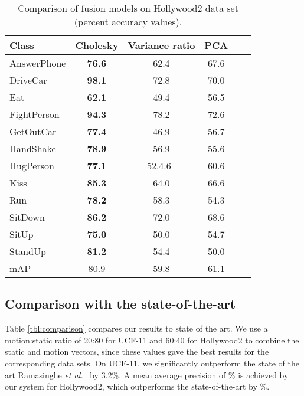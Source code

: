 \begin{table}[]
\centering
\caption{Comparison of fusion models on Hollywood2 data set (percent accuracy values).}\label{tbl:per-action fusionhollywood}
\begin{tabular}{@{} l c c c c r @{}}
\toprule
Class            & Cholesky & Variance ratio & PCA   \\ \midrule \midrule
AnswerPhone      & \textbf{76.6}& 62.4    & 67.6           \\
DriveCar         & \textbf{98.1}& 72.8    & 70.0       \\
Eat              & \textbf{62.1}& 49.4    & 56.5          \\
FightPerson      & \textbf{94.3}& 78.2    & 72.6         \\
GetOutCar        & \textbf{77.4}& 46.9    & 56.7          \\
HandShake        & \textbf{78.9}         & 56.9    & 55.6            \\
HugPerson        & \textbf{77.1}& 52.4.6\   & 60.6            \\
Kiss             &\textbf{85.3}         & 64.0    & 66.6           \\
Run              & \textbf{78.2}         & 58.3    & 54.3            \\
SitDown          & \textbf{86.2}         & 72.0    & 68.6            \\
SitUp            & \textbf{75.0}         & 50.0    & 54.7          \\
StandUp          & \textbf{81.2}         & 54.4    & 50.0          \\ \midrule
mAP              &      80.9          &   59.8        &       61.1             \\ \bottomrule
\end{tabular}
\end{table}


\subsection{Comparison with the state-of-the-art}

Table \ref{tbl:comparison} compares our results to state of the art. We use a motion:static ratio of 20:80 for UCF-11 and 60:40
for Hollywood2 to combine the static and motion vectors,
since these values gave the best results for the corresponding data sets. On UCF-11, we significantly outperform
the state of the art Ramasinghe \emph{et al.}~\cite{7486474} by 3.2\%. A mean average precision of \% is achieved by our system for Hollywood2, which outperforms
the state-of-the-art by \%.

